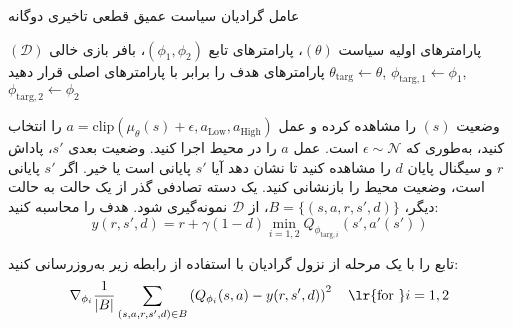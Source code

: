   \begin{algorithm}[H]
  	\caption{عامل گرادیان سیاست عمیق قطعی تاخیری دوگانه}\label{alg:TD3}
  	\begin{algorithmic}[1]
  		 پارامترهای اولیه سیاست
  		$(\theta)$، پارامترهای تابع
  		$(\phi_1, \phi_2)$،
  		 بافر بازی خالی $(\mathcal{D})$
  		\State پارامترهای هدف را برابر با پارامترهای اصلی قرار دهید
  		$\theta_{\text{targ}} \leftarrow \theta$,
  		 $\phi_{\text{targ}, 1} \leftarrow \phi_1$,
  		  $\phi_{\text{targ}, 2} \leftarrow \phi_2$
  		
  		\State 
  		وضعیت $(s)$ را مشاهده کرده و عمل 
  		$a = \text{clip}(\mu_{\theta}(s) + \epsilon, a_{\text{Low}}, a_{\text{High}})$
  		 را انتخاب کنید، به‌طوری که $\epsilon \sim \mathcal{N}$ است.
  		\State عمل $a$ را در محیط اجرا کنید.
  		\State 
  		وضعیت بعدی $s'$، پاداش $r$ و سیگنال پایان $d$ را مشاهده کنید تا نشان دهد آیا $s'$ پایانی است یا خیر.
  		\State اگر $s'$ پایانی است، وضعیت محیط را بازنشانی کنید.
  		\State یک دسته تصادفی گذر از ‌یک حالت به حالت دیگر، $B = \{ (s,a,r,s',d) \}$، از $\mathcal{D}$ نمونه‌گیری شود.
  		\State
  		هدف را محاسبه کنید:
  		\begin{equation*}
  			 y(r,s',d) = r + \gamma (1-d) \min_{i=1,2} Q_{\phi_{\text{targ},i}}(s', a'(s')) 
  		\end{equation*}
  		
  		\State تابع  را با یک مرحله از نزول گرادیان با استفاده از رابطه زیر به‌روزرسانی کنید:
  		\begin{align*} 
  			 \nabla_{\phi_i} \frac{1}{|B|}\sum_{(s,a,r,s',d) \in B} \left( Q_{\phi_i}(s,a) - y(r,s',d) \right)^2 
  			 \quad \text{\lr{for }}i=1,2 
  		\end{align*}
  		

\end{algorithmic}
\end{algorithm}
